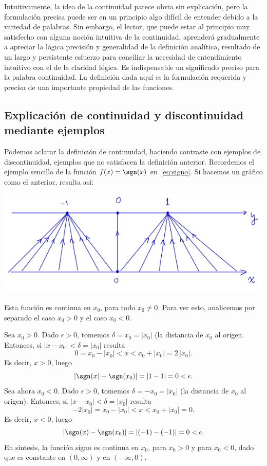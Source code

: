 Intuitivamente, la idea de la continuidad parece obvia sin explicación, pero la formulación precisa puede ser en un principio algo difícil de entender debido a la variedad de palabras. 
Sin embargo, el lector, que puede estar al principio muy satisfecho con alguna noción intuitiva de la continuidad, aprenderá gradualmente a apreciar la lógica precisión y generalidad de la definición analítica, resultado de un largo y persistente esfuerzo para conciliar la necesidad de entendimiento intuitivo con el de la claridad lógica.
Es indispensable un significado preciso para la palabra continuidad. La definición dada aquí es la formulación requerida y precisa de una importante propiedad de las funciones.

\subsection*{Explicación de continuidad y discontinuidad mediante ejemplos}

Podemos aclarar la definición de continuidad, haciendo contraste con ejemplos de discontinuidad, ejemplos que no satisfacen la definición anterior. Recordemos el ejemplo sencillo de la función $f(x)=\sgn(x)$ en~\eqref{eq:signo}. Si hacemos un gráfico como el anterior, resulta así:

\centerline{\includegraphics[width=.8\textwidth]{pics/signo.png}}

Esta función es continua en $x_0$, para todo $x_0\neq 0$. Para ver esto, analicemos por separado el caso $x_0>0$ y el caso $x_0<0$.

Sea $x_0 > 0$. Dado $\epsilon>0$, tomemos $\delta = x_0 = |x_0|$ (la distancia de $x_0$ al origen. Entonces, si $|x-x_0|<\delta=|x_0|$ resulta 
\[
0 = x_0-|x_0| < x < x_0+|x_0| = 2 \, |x_0|.
\]
Es decir, $x>0$, luego
\[
|\sgn(x)-\sgn(x_0)| = |1 - 1| = 0 < \epsilon.
\]
Sea ahora $x_0 <0$. Dado $\epsilon>0$, tomemos $\delta = -x_0 = |x_0|$ (la distancia de $x_0$ al origen). Entonces, si $|x-x_0|<\delta=|x_0|$ resulta 
\[
-2|x_0| = x_0-|x_0| < x < x_0+|x_0| = 0.
\]
Es decir, $x<0$, luego
\[
|\sgn(x)-\sgn(x_0)| = |(-1) - (-1)| = 0 < \epsilon.
\]
En síntesis, la función signo es continua en $x_0$, para $x_0>0$ y para $x_0<0$, dado que es constante en $(0,\infty)$ y en $(-\infty,0)$.

